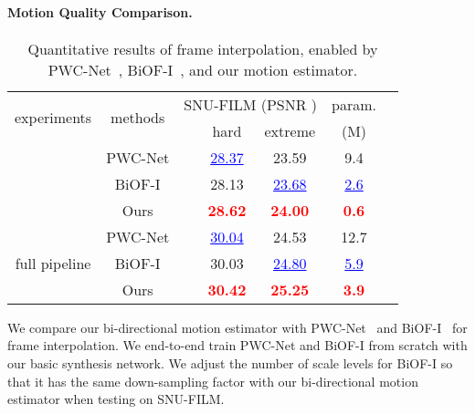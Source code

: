 \documentclass[10pt,twocolumn,letterpaper]{article}
\begin{document}
\paragraph{Motion Quality Comparison.}


\begin{table}[tb]
\centering
\setlength{\tabcolsep}{0pt}
\begin{tabular*}{0.48\textwidth}{@{\extracolsep{\fill}}*{6}{c}}
\hline
\multirow{2}{*}{experiments} & \multirow{2}{*}{methods}
                             & \multicolumn{2}{c}{SNU-FILM (PSNR )}
                             & param.\\
\cline{3-4}
                             &   & ~~~hard & extreme & (M) \\
\Xhline{2\arrayrulewidth}
\multirow{3}{*}{warp approx.}
& PWC-Net & ~~~\textcolor{blue}{\underline{28.37}}  & 23.59 & 9.4 \\
                             & BiOF-I & ~~~28.13  &
                             \textcolor{blue}{\underline{23.68}} & \textcolor{blue}{\underline{2.6}} \\
                             & Ours & ~~~\textcolor{red}{\textbf{28.62}} &  \textcolor{red}{\textbf{24.00}}
                             & \textcolor{red}{\textbf{0.6}} \\
\hline
\multirow{3}{*}{full pipeline} 
& PWC-Net & ~~~\textcolor{blue}{\underline{30.04}} & 24.53 &12.7   \\
                               & BiOF-I & ~~~30.03  &
                             \textcolor{blue}{\underline{24.80}}  & \textcolor{blue}{\underline{5.9}} \\
                               & Ours & ~~~\textcolor{red}{\textbf{30.42}} &  \textcolor{red}{\textbf{25.25}}
                               & \textcolor{red}{\textbf{3.9}}\\
\hline
\end{tabular*}
\caption{Quantitative results of frame interpolation, enabled by
PWC-Net~\cite{sun2018pwc}, BiOF-I~\cite{sim2021xvfi}, and our motion estimator.}
\label{tab:ablation_motion}
\end{table}


We compare our bi-directional motion estimator with PWC-Net~\cite{sun2018pwc}
and BiOF-I~\cite{sim2021xvfi} for frame interpolation.  We end-to-end train
PWC-Net and BiOF-I from scratch with our basic synthesis network.  We
adjust the number of scale levels for BiOF-I so that it has the same
down-sampling factor with our bi-directional motion estimator when testing on
SNU-FILM.
\end{document}
